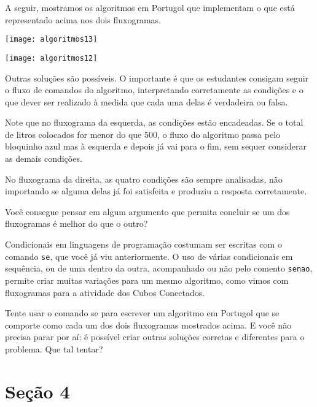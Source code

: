 \begin{texto}
{
A seguir, mostramos os algoritmos em Portugol que implementam o que está representado acima nos dois fluxogramas.

\centering
\texttt{[image: algoritmos13]}

\texttt{[image: algoritmos12]}
\justify

Outras soluções são possíveis. O importante é que os estudantes consigam seguir o fluxo de comandos do algoritmo, interpretando corretamente as condições e o que dever ser realizado à medida que cada uma delas é verdadeira ou falsa.
}
\end{texto}

Note que no fluxograma da esquerda, as condições estão encadeadas. Se o total de litros colocados for menor do que 500, o fluxo do algoritmo passa pelo bloquinho azul mas à esquerda e depois já vai para o fim, sem sequer considerar as demais condições.

No fluxograma da direita, as quatro condições são sempre analisadas, não importando se alguma delas já foi satisfeita e produziu a resposta corretamente.

\begin{reflection}
Você consegue pensar em algum argumento que permita concluir se um dos fluxogramas é melhor do que o outro?
\end{reflection}


Condicionais em linguagens de programação costumam ser escritas com o comando \verb|se|, que você já viu anteriormente. O uso de várias condicionais em sequência, ou de uma dentro da outra, acompanhado ou não pelo comento \verb|senao|, permite criar muitas variações para um mesmo algoritmo, como vimos com fluxogramas para a atividade dos Cubos Conectados.

Tente usar o comando se para escrever um algoritmo em Portugol que se comporte como cada um dos dois fluxogramas mostrados acima. E você não precisa parar por aí: é possível criar outras soluções corretas e diferentes para o problema. Que tal tentar?

\section{Seção 4}

